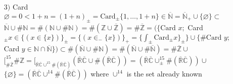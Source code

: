 \documentclass{article}
\begin{document}
\begin{itemize}
    $\{(x_\pm)_+,\{\{x_\pm\}_\mp\}_{\pm_1}\} \subset \left( \{ \int (x_2)_{\mp} ; \int \equiv \int_{\pm_1}\} \cup \{ x_\mp\}_{\pm_1} \cup \{\{x_\pm\}_{\mp_1}\}_{\pm} \right) \cap x_- S_- \}\}_+ $\newline
    $=\bigl[_S S_- = \bigl[_{\#\varnothing} S_- = \bigl[_{\# \varnothing}  \biggl( \{\rceil_- \rceil_\pm\}+ , \{ \dot{\rceil}_- \rceil_\pm\}_+,  \{ \dot{\rceil}_- \dot{\rceil}_\pm\}_+,\dots,\varnothing \in \{\varnothing\}\}\cup$\newline
    $\{\rceil \{\rceil_\pm \rceil_\pm\}_+ , \dot{\rceil}\{\rceil_\pm\rceil_\pm\}_+ , \dot{\rceil}\{\dot\rceil_\pm\rceil_\pm\}_+ , \dot{\rceil}\{\dot\rceil_\pm \dot\rceil_\pm\},\dots,\varnothing \in \{\varnothing\}\}  \biggl) = $\newline
    $\bigl[_{\#\varnothing} \{\{x_\pm\}_+;\{y_\pm\}_+ \in \{ (y_\mp\dot\in\#\varnothing), (y_\mp\dot\in\#\varnothing)\}\} = \bigl[_{S_+\cup S_- \cup \{\varnothing\} } S_- = $\newline
    the general Euclydian space $S_+;$
    \item[$3)$] Card $\varnothing =0 < 1+n = (1+n)_\pm = \text{Card}_\pm \{1,\dots,1+n\} \in \overline{\mathbb{N}} = \overline{\mathbb{N}}_+ \cup \{\varnothing\} \subset $ \newline 
    $\overline{\mathbb{N}}\cup \#\mathbb{N} = \#(\mathbb{N} \cup \#\mathbb{N}) = \# (\mathbb{Z}\cup\overline{\mathbb{Z}}) = \# \overline{\mathbb{Z}} = \bigl(\{\text{Card } x; $\newline
    Card$_\pm x \in \{(x\in \{x\})\}_\pm = \{(x\in_- \{x\})\}_+ = \{ \int_\pm \text{Card}_\pm x\}_\pm \} \cup \{\# \text{Card }y;$\newline            
    Card $y\in \mathbb{N}\cap \overline{\mathbb{N}}\} \bigl) \subset \# (\overline{\mathbb{N}}\cup \# \mathbb{N}) = \# (\overline{\mathbb{N}}\cup \# \overline{\mathbb{N}}) = \#\overline{\mathbb{Z}} \cup $\newline
    $\bigl[^{15}_{\#\overline{\mathbb{Z}}} \#\mathbb{Z} = \bigl[_{\overline{\mathbb{R}}\overline{\mathbb{C}}\cup^{15}\#(\overline{\mathbb{R}}\overline{\mathbb{C}})} (\overline{\mathbb{R}}\overline{\mathbb{C}}\cup\#(\overline{\mathbb{R}}\overline{\mathbb{C}})) = (\overline{\mathbb{R}}\overline{\mathbb{C}}\cup_\pm^{15}\#(\overline{\mathbb{R}}\overline{\mathbb{C}})) \cup$\newline
    $\{\varnothing\} = (\overline{\mathbb{R}}\overline{\mathbb{C}}\cup^{14}\#(\overline{\mathbb{R}}\overline{\mathbb{C}}))$ where $\cup^{14}$ is the set already known\newline

\end{itemize}
\end{document}
